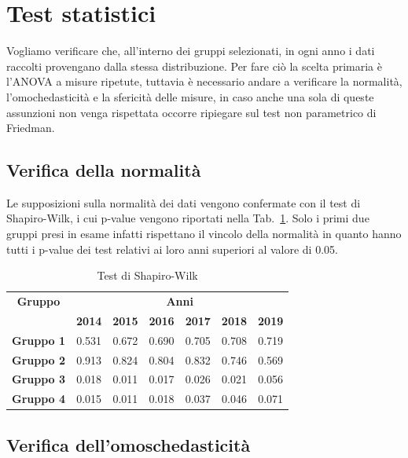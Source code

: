 \documentclass[conference]{IEEEtran}
\begin{document}
\section{Test statistici}

Vogliamo verificare che, all'interno dei gruppi selezionati,
in ogni anno i dati raccolti provengano dalla stessa distribuzione.
Per fare ciò la scelta primaria è l'ANOVA a misure ripetute,
tuttavia è necessario andare a verificare la normalità,
l'omochedasticità e la sfericità delle misure, in caso
anche una sola di queste assunzioni non venga rispettata occorre
ripiegare sul test non parametrico di Friedman.

\subsection{Verifica della normalità}

Le supposizioni sulla normalità dei dati vengono confermate
con il test di Shapiro-Wilk, i cui p-value vengono riportati nella Tab.~\ref{tab1}.
Solo i primi due gruppi presi in esame infatti rispettano il vincolo della normalità
in quanto hanno tutti i p-value dei test relativi ai loro anni superiori al valore di 0.05.
\begin{table}[htbp]
    \caption{Test di Shapiro-Wilk}
    \begin{center}
    \begin{tabular}{|c|c|c|c|c|c|c|}
    \hline
    \textbf{Gruppo}&\multicolumn{6}{|c|}{\textbf{Anni}} \\
    \cline{2-7} 
     & \textbf{2014} & \textbf{2015} & \textbf{2016} & \textbf{2017} & \textbf{2018} & \textbf{2019}\\
    \hline
    \textbf{Gruppo 1} & 0.531 & 0.672 & 0.690 & 0.705 & 0.708 & 0.719 \\\cline{1-7}
    \textbf{Gruppo 2} & 0.913 & 0.824 & 0.804 & 0.832 & 0.746 & 0.569 \\\cline{1-7}
    \textbf{Gruppo 3} & 0.018 & 0.011 & 0.017 & 0.026 & 0.021 & 0.056 \\\cline{1-7}
    \textbf{Gruppo 4} & 0.015 & 0.011 & 0.018 & 0.037 & 0.046 & 0.071 \\\cline{1-7}
    \hline
    \end{tabular}
    \label{tab1}
    \end{center}
\end{table}

\subsection{Verifica dell'omoschedasticità}
\end{document}
